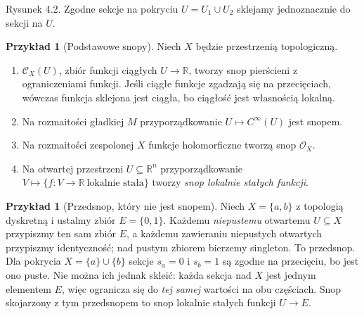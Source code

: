 \documentclass[11pt,a4paper,openany]{report}
\numberwithin{equation}{section}
\theoremstyle{plain}
\theoremstyle{definition}
\newtheorem{przyklad}[twierdzenie]{Przykład}
\theoremstyle{remark}
\newcommand{\R}{\mathbb R}
\begin{document}
\begin{center}

{\small Rysunek 4.2. Zgodne sekcje na pokryciu $U=U_1\cup U_2$ sklejamy jednoznacznie do sekcji na $U$.}\par
\end{center}

\begin{przyklad}[Podstawowe snopy]
Niech $X$ będzie przestrzenią topologiczną.
\begin{enumerate}[label=\alph*)]
\item $\mathcal C_X(U)$, zbiór funkcji ciągłych $U\to\R$,
tworzy snop pierścieni z ograniczeniami funkcji.
Jeśli ciągłe funkcje zgadzają się na przecięciach,
wówczas funkcja sklejona jest ciągła, bo ciągłość
jest własnością lokalną.
\item Na rozmaitości gładkiej $M$ przyporządkowanie
$U\mapsto C^\infty(U)$ jest snopem.
\item Na rozmaitości zespolonej $X$ funkcje holomorficzne
tworzą snop $\mathcal O_X$.
\item Na otwartej przestrzeni $U\subseteq\R^n$ przyporządkowanie
$V\mapsto\{f:V\to\R\ \text{lokalnie stała}\}$
tworzy \emph{snop lokalnie stałych funkcji}.
\end{enumerate}
\end{przyklad}

\begin{przyklad}[Przedsnop, który nie jest snopem]
\label{prz:presheaf-not-sheaf}
Niech $X=\{a,b\}$ z topologią dyskretną i ustalmy
zbiór $E=\{0,1\}$. Każdemu \emph{niepustemu}
otwartemu $U\subseteq X$ przypiszmy ten sam zbiór $E$,
a każdemu zawieraniu niepustych otwartych przypiszmy
identyczność; nad pustym zbiorem bierzemy singleton.
To przedsnop. Dla pokrycia $X=\{a\}\cup\{b\}$
sekcje $s_a=0$ i $s_b=1$ są zgodne na przecięciu,
bo jest ono puste. Nie można ich jednak skleić:
każda sekcja nad $X$ jest jednym elementem $E$,
więc ogranicza się do \emph{tej samej} wartości
na obu częściach. Snop skojarzony z tym przedsnopem
to snop lokalnie stałych funkcji $U\to E$.
\end{przyklad}
\end{document}
